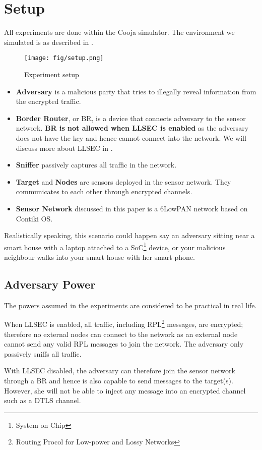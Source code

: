 \chapter{Setup}
All experiments are done within the Cooja simulator. The environment we simulated is as described in .

\begin{figure*}
\centering
{
	\texttt{[image: fig/setup.png]}
}
\caption{Experiment setup} \label{fig: Setup}
\end{figure*}

\begin{itemize}
\item{\bf Adversary} is a malicious party that tries to illegally reveal information from the encrypted traffic.
\item{\bf Border Router}, or BR, is a device that connects adversary to the sensor network. \textbf{BR is not allowed when LLSEC is enabled} as the adversary does not have the key and hence cannot connect into the network. We will discuss more about LLSEC in .
\item{\bf Sniffer} passively captures all traffic in the network. 
\item{\bf Target} and {\bf Nodes} are sensors deployed in the sensor network. They communicates to each other through encrypted channels.
\item{\bf Sensor Network} discussed in this paper is a 6LowPAN network based on Contiki OS.
\end{itemize}

Realistically speaking, this scenario could happen say an adversary sitting near a smart house with a laptop attached to a SoC\footnote{System on Chip} device, or your malicious neighbour walks into your smart house with her smart phone.

\section{Adversary Power}
The powers assumed in the experiments are considered to be practical in real life.

When LLSEC is enabled, all traffic, including RPL\footnote{Routing Procol for Low-power and Lossy Networks} messages, are encrypted; therefore no external nodes can connect to the network as an external node cannot send any valid RPL messages to join the network. The adversary only passively sniffs all traffic.

With LLSEC disabled, the adversary can therefore join the sensor network through a BR and hence is also capable to send messages to the target(s). However, she will not be able to inject any message into an encrypted channel such as a DTLS channel.

